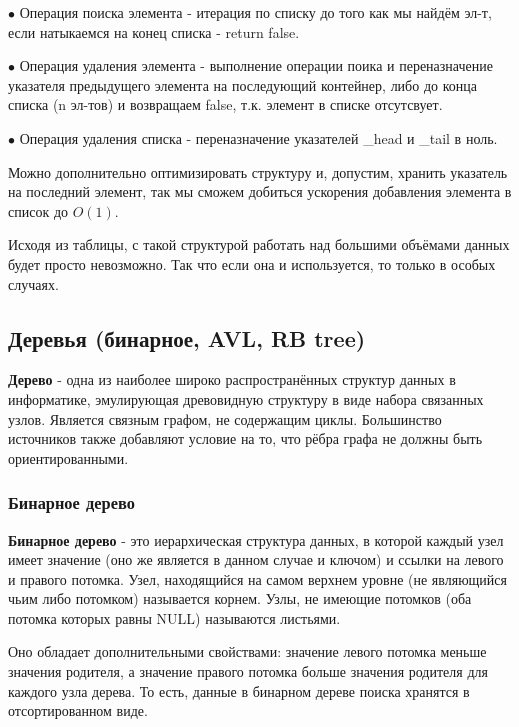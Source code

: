 \documentclass[utf8,14pt,a4paper,oneside,russian]{book}
\begin{document}
	$\bullet$ Операция поиска элемента - итерация по списку до того как мы найдём эл-т, если натыкаемся на конец списка - return false.
	
	$\bullet$ Операция удаления элемента - выполнение операции поика и переназначение указателя предыдущего элемента на последующий контейнер, либо до конца списка (n эл-тов) и возвращаем false, т.к. элемент в списке отсутсвует.
	
	$\bullet$ Операция удаления списка - переназначение указателей \_head и \_tail в ноль.

	Можно дополнительно оптимизировать структуру и, допустим, хранить указатель на последний элемент, так мы сможем добиться ускорения добавления элемента в список до $O(1)$.
	
	Исходя из таблицы, с такой структурой работать над большими объёмами данных будет просто невозможно. Так что если она и используется, то только в особых случаях.
	
	\subsection{Деревья (бинарное, AVL, RB tree)}
	
	\textbf{Дерево} - одна из наиболее широко распространённых структур данных в информатике, эмулирующая древовидную структуру в виде набора связанных узлов. Является связным графом, не содержащим циклы. Большинство источников также добавляют условие на то, что рёбра графа не должны быть ориентированными.
	
	\subsubsection{Бинарное дерево}
	
	\textbf{Бинарное дерево} - это иерархическая структура данных, в которой каждый узел имеет значение (оно же является в данном случае и ключом) и ссылки на левого и правого потомка. Узел, находящийся на самом верхнем уровне (не являющийся чьим либо потомком) называется корнем. Узлы, не имеющие потомков (оба потомка которых равны NULL) называются листьями.
	
	Оно обладает дополнительными свойствами: значение левого потомка меньше значения родителя, а значение правого потомка больше значения родителя для каждого узла дерева. То есть, данные в бинарном дереве поиска хранятся в отсортированном виде.
	
\end{document}
